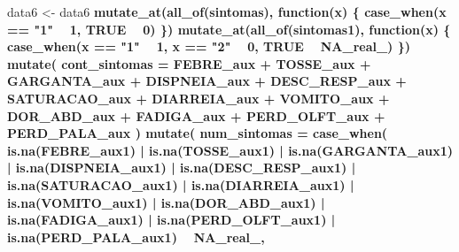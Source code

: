 \documentclass[
]{article}
\newenvironment{Shaded}{\begin{snugshade}}{\end{snugshade}}
\newcommand{\ControlFlowTok}[1]{\textcolor[rgb]{0.13,0.29,0.53}{\textbf{#1}}}
\newcommand{\DataTypeTok}[1]{\textcolor[rgb]{0.13,0.29,0.53}{#1}}
\newcommand{\DecValTok}[1]{\textcolor[rgb]{0.00,0.00,0.81}{#1}}
\newcommand{\KeywordTok}[1]{\textcolor[rgb]{0.13,0.29,0.53}{\textbf{#1}}}
\newcommand{\NormalTok}[1]{#1}
\newcommand{\OperatorTok}[1]{\textcolor[rgb]{0.81,0.36,0.00}{\textbf{#1}}}
\newcommand{\OtherTok}[1]{\textcolor[rgb]{0.56,0.35,0.01}{#1}}
\newcommand{\StringTok}[1]{\textcolor[rgb]{0.31,0.60,0.02}{#1}}
\begin{document}
\begin{Shaded}
\begin{Highlighting}[]
\NormalTok{data6 <-}\StringTok{  }\NormalTok{data6 }\OperatorTok{%>%}
\StringTok{  }\KeywordTok{mutate_at}\NormalTok{(}\KeywordTok{all_of}\NormalTok{(sintomas), }\ControlFlowTok{function}\NormalTok{(x) \{}
    \KeywordTok{case_when}\NormalTok{(x }\OperatorTok{==}\StringTok{ "1"} \OperatorTok{~}\StringTok{ }\DecValTok{1}\NormalTok{, }\OtherTok{TRUE} \OperatorTok{~}\StringTok{ }\DecValTok{0}\NormalTok{)}
\NormalTok{  \}) }\OperatorTok{%>%}
\StringTok{  }\KeywordTok{mutate_at}\NormalTok{(}\KeywordTok{all_of}\NormalTok{(sintomas1), }\ControlFlowTok{function}\NormalTok{(x) \{}
    \KeywordTok{case_when}\NormalTok{(x }\OperatorTok{==}\StringTok{ "1"} \OperatorTok{~}\StringTok{ }\DecValTok{1}\NormalTok{, x }\OperatorTok{==}\StringTok{ "2"} \OperatorTok{~}\StringTok{ }\DecValTok{0}\NormalTok{, }\OtherTok{TRUE} \OperatorTok{~}\StringTok{ }\OtherTok{NA_real_}\NormalTok{)}
\NormalTok{  \}) }\OperatorTok{%>%}
\StringTok{  }\KeywordTok{mutate}\NormalTok{(}
    \DataTypeTok{cont_sintomas =}\NormalTok{ FEBRE_aux }\OperatorTok{+}\StringTok{ }\NormalTok{TOSSE_aux }\OperatorTok{+}\StringTok{  }\NormalTok{GARGANTA_aux }\OperatorTok{+}\StringTok{ }\NormalTok{DISPNEIA_aux }\OperatorTok{+}\StringTok{ }\NormalTok{DESC_RESP_aux }\OperatorTok{+}
\StringTok{      }\NormalTok{SATURACAO_aux }\OperatorTok{+}\StringTok{ }\NormalTok{DIARREIA_aux }\OperatorTok{+}\StringTok{ }\NormalTok{VOMITO_aux }\OperatorTok{+}\StringTok{ }\NormalTok{DOR_ABD_aux }\OperatorTok{+}\StringTok{ }\NormalTok{FADIGA_aux }\OperatorTok{+}\StringTok{ }
\StringTok{     }\NormalTok{PERD_OLFT_aux }\OperatorTok{+}\StringTok{ }\NormalTok{PERD_PALA_aux}
\NormalTok{  ) }\OperatorTok{%>%}
\StringTok{  }\KeywordTok{mutate}\NormalTok{(}
    \DataTypeTok{num_sintomas =} \KeywordTok{case_when}\NormalTok{(}
      \KeywordTok{is.na}\NormalTok{(FEBRE_aux1) }\OperatorTok{|}
\StringTok{        }\KeywordTok{is.na}\NormalTok{(TOSSE_aux1) }\OperatorTok{|}
\StringTok{        }\KeywordTok{is.na}\NormalTok{(GARGANTA_aux1) }\OperatorTok{|}
\StringTok{        }\KeywordTok{is.na}\NormalTok{(DISPNEIA_aux1) }\OperatorTok{|}
\StringTok{        }\KeywordTok{is.na}\NormalTok{(DESC_RESP_aux1) }\OperatorTok{|}
\StringTok{        }\KeywordTok{is.na}\NormalTok{(SATURACAO_aux1) }\OperatorTok{|}\StringTok{ }\KeywordTok{is.na}\NormalTok{(DIARREIA_aux1) }\OperatorTok{|}
\StringTok{        }\KeywordTok{is.na}\NormalTok{(VOMITO_aux1) }\OperatorTok{|}
\StringTok{        }\KeywordTok{is.na}\NormalTok{(DOR_ABD_aux1) }\OperatorTok{|}
\StringTok{        }\KeywordTok{is.na}\NormalTok{(FADIGA_aux1) }\OperatorTok{|}
\StringTok{        }\KeywordTok{is.na}\NormalTok{(PERD_OLFT_aux1) }\OperatorTok{|}\StringTok{ }\KeywordTok{is.na}\NormalTok{(PERD_PALA_aux1) }\OperatorTok{~}\StringTok{ }\OtherTok{NA_real_}\NormalTok{,}
}}}}
\end{Highlighting}
\end{Shaded}
\end{document}
